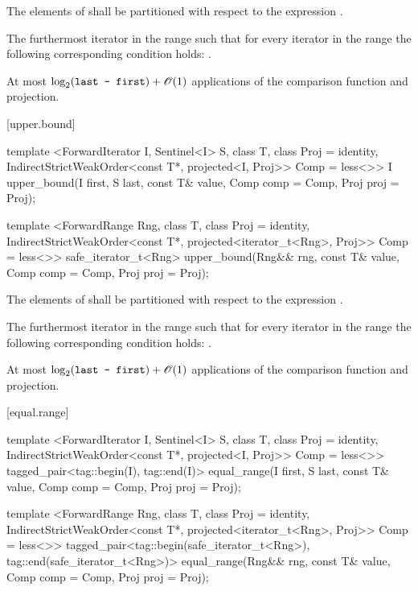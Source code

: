\begin{itemdescr}
\pnum
\requires
The elements
of
shall be partitioned with respect to the expression
.

\pnum
\returns
The furthermost iterator
in the range
such that for every iterator
in the range
the following corresponding condition holds:
.

\pnum
\complexity
At most
$\log_2(\texttt{last - first}) + \mathscr{O}(1)$
applications of the comparison function and projection.
\end{itemdescr}

[upper.bound]{}

%
\begin{itemdecl}
template <ForwardIterator I, Sentinel<I> S, class T, class Proj = identity,
    IndirectStrictWeakOrder<const T*, projected<I, Proj>> Comp = less<>>
  I
    upper_bound(I first, S last, const T& value, Comp comp = Comp{}, Proj proj = Proj{});

template <ForwardRange Rng, class T, class Proj = identity,
    IndirectStrictWeakOrder<const T*, projected<iterator_t<Rng>, Proj>> Comp = less<>>
  safe_iterator_t<Rng>
    upper_bound(Rng&& rng, const T& value, Comp comp = Comp{}, Proj proj = Proj{});
\end{itemdecl}

\begin{itemdescr}
\pnum
\requires
The elements
of
shall be partitioned with respect to the expression
.

\pnum
\returns
The furthermost iterator
in the range
such that for every iterator
in the range
the following corresponding condition holds:
.

\pnum
\complexity
At most
$\log_2(\texttt{last - first}) + \mathscr{O}(1)$
applications of the comparison function and projection.
\end{itemdescr}

[equal.range]{}

%
\begin{itemdecl}
template <ForwardIterator I, Sentinel<I> S, class T, class Proj = identity,
    IndirectStrictWeakOrder<const T*, projected<I, Proj>> Comp = less<>>
  tagged_pair<tag::begin(I), tag::end(I)>
    equal_range(I first, S last, const T& value, Comp comp = Comp{}, Proj proj = Proj{});

template <ForwardRange Rng, class T, class Proj = identity,
    IndirectStrictWeakOrder<const T*, projected<iterator_t<Rng>, Proj>> Comp = less<>>
  tagged_pair<tag::begin(safe_iterator_t<Rng>),
              tag::end(safe_iterator_t<Rng>)>
    equal_range(Rng&& rng, const T& value, Comp comp = Comp{}, Proj proj = Proj{});
\end{itemdecl}

